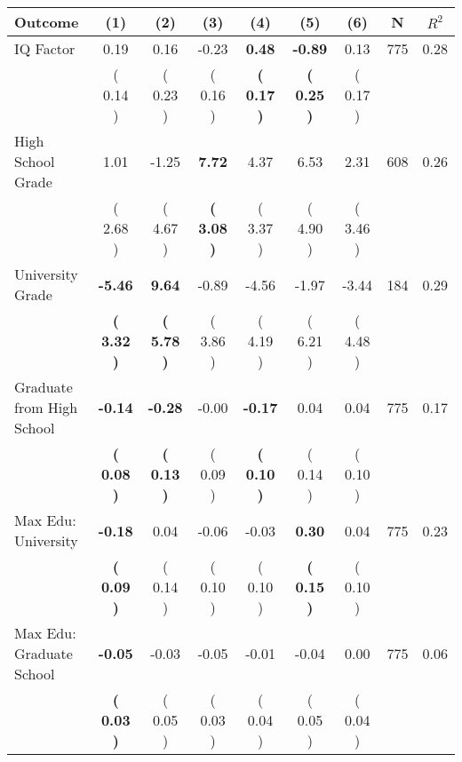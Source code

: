 \begin{tabular}{lcccccccc}
\toprule
 \textbf{Outcome} & \textbf{(1)} & \textbf{(2)} & \textbf{(3)} & \textbf{(4)} & \textbf{(5)} & \textbf{(6)} & \textbf{N} & \textbf{$ R^2$} \\
\midrule
IQ Factor &      0.19 &      0.16 &     -0.23 & \textbf{     0.48} & \textbf{    -0.89} &      0.13 & 775 &       0.28 \\ 
 & (     0.14 ) & (     0.23 ) & (     0.16 ) & \textbf{(     0.17 )} & \textbf{(     0.25 )} & (     0.17 ) & \\
High School Grade &      1.01 &     -1.25 & \textbf{     7.72} &      4.37 &      6.53 &      2.31 & 608 &       0.26 \\ 
 & (     2.68 ) & (     4.67 ) & \textbf{(     3.08 )} & (     3.37 ) & (     4.90 ) & (     3.46 ) & \\
University Grade & \textbf{    -5.46} & \textbf{     9.64} &     -0.89 &     -4.56 &     -1.97 &     -3.44 & 184 &       0.29 \\ 
 & \textbf{(     3.32 )} & \textbf{(     5.78 )} & (     3.86 ) & (     4.19 ) & (     6.21 ) & (     4.48 ) & \\
Graduate from High School & \textbf{    -0.14} & \textbf{    -0.28} &     -0.00 & \textbf{    -0.17} &      0.04 &      0.04 & 775 &       0.17 \\ 
 & \textbf{(     0.08 )} & \textbf{(     0.13 )} & (     0.09 ) & \textbf{(     0.10 )} & (     0.14 ) & (     0.10 ) & \\
Max Edu: University & \textbf{    -0.18} &      0.04 &     -0.06 &     -0.03 & \textbf{     0.30} &      0.04 & 775 &       0.23 \\ 
 & \textbf{(     0.09 )} & (     0.14 ) & (     0.10 ) & (     0.10 ) & \textbf{(     0.15 )} & (     0.10 ) & \\
Max Edu: Graduate School & \textbf{    -0.05} &     -0.03 &     -0.05 &     -0.01 &     -0.04 &      0.00 & 775 &       0.06 \\ 
 & \textbf{(     0.03 )} & (     0.05 ) & (     0.03 ) & (     0.04 ) & (     0.05 ) & (     0.04 ) & \\
\bottomrule
\end{tabular}
